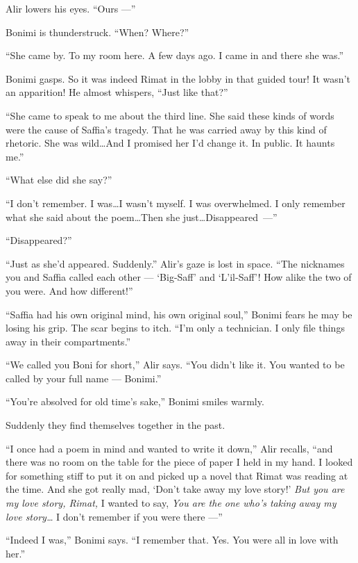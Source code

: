 \documentclass[twoside,11pt,openany]{book}
\begin{document}
Alir lowers his eyes. ``Ours ---''

Bonimi is thunderstruck. ``When? Where?''

``She came by. To my room here. A few days ago. I came in and there she was.''

Bonimi gasps. So it was indeed Rimat in the lobby in that guided tour! It wasn't an apparition! He almost whispers,
``Just like that?''

``She came to speak to me about the third line. She said these kinds of words were the cause of Saffia's
tragedy. That he was carried away by this kind of rhetoric. She was wild{\ldots}And I promised her
I'd change it. In public. It haunts me.''

``What else did she say?''

``I don't remember. I was{\ldots}I wasn't myself. I was overwhelmed. I only remember what she said about
the poem{\ldots}Then she just{\ldots}\linebreak[4]Disappeared~---''

``Disappeared?''

``Just as she'd appeared. Suddenly.'' Alir's gaze is lost in space. ``The
nicknames you and Saffia called each other --- `Big-Saff' and `L'il-Saff'! How alike the two of you were. And how
different!''

``Saffia had his own original mind, his own original soul,'' Bonimi fears he may be losing his
grip. The scar begins to itch. ``I'm only a technician. I only file things away in their
compartments.''

``We called you Boni for short,'' Alir says. ``You didn't like it. You wanted to
be called by your full name --- Bonimi.''

``You're absolved for old time's sake,'' Bonimi smiles warmly.

Suddenly they find themselves together in the past.

``I once had a poem in mind and wanted to write it down,'' Alir recalls, ``and
there was no room on the table for the piece of paper I held in my hand.  I looked for something stiff to put it on and
picked up a novel that Rimat was reading at the time. And she got really mad, `Don't take away my love story!'
\textit{But you are my love story, Rimat, }I wanted to say, \textit{You are the one who's taking away my love
story{\ldots}} I don't remember if you were there ---''

``Indeed I was,'' Bonimi says. ``I remember that. Yes. You were all in love with
her.''
\end{document}
